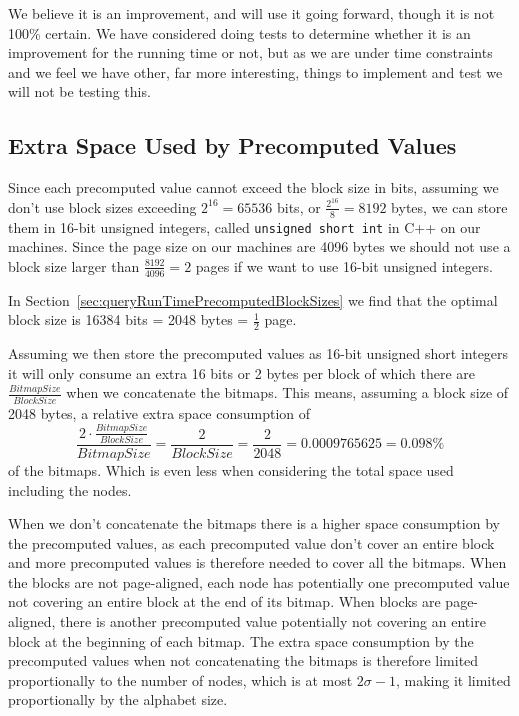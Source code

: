 We believe it is an improvement, and will use it going forward, though it is not 100\% certain.
We have considered doing tests to determine whether it is an improvement for the running time or not, but as we are under time constraints and we feel we have other, far more interesting, things to implement and test we will not be testing this.



\subsection{Extra Space Used by Precomputed Values}
Since each precomputed value cannot exceed the block size in bits, assuming we don't use block sizes exceeding $2^{16} = 65536$ bits, or $\frac{2^{16}}{8} = 8192$ bytes, we can store them in 16-bit unsigned integers, called \texttt{unsigned short int} in C++ on our machines.
Since the page size on our machines are 4096 bytes we should not use a block size larger than $\frac{8192}{4096} = 2$ pages if we want to use 16-bit unsigned integers.

In Section~\ref{sec:queryRunTimePrecomputedBlockSizes} we find that the optimal block size is 16384 bits = 2048 bytes = $\frac{1}{2}$ page.

Assuming we then store the precomputed values as 16-bit unsigned short integers it will only consume an extra 16 bits or 2 bytes per block of which there are $\frac{BitmapSize}{BlockSize}$ when we concatenate the bitmaps.
This means, assuming a block size of 2048 bytes, a relative extra space consumption of
\[ \frac{ 2 \cdot \frac{BitmapSize}{BlockSize} }{BitmapSize} = \frac{2}{BlockSize} = \frac{2}{2048} = 0.0009765625 = 0.098\% \]
of the bitmaps.
Which is even less when considering the total space used including the nodes.

When we don't concatenate the bitmaps there is a higher space consumption by the precomputed values, as each precomputed value don't cover an entire block and more precomputed values is therefore needed to cover all the bitmaps.
When the blocks are not page-aligned, each node has potentially one precomputed value not covering an entire block at the end of its bitmap.
When blocks are page-aligned, there is another precomputed value potentially not covering an entire block at the beginning of each bitmap.
The extra space consumption by the precomputed values when not concatenating the bitmaps is therefore limited proportionally to the number of nodes, which is at most $2 \sigma - 1$, making it limited proportionally by the alphabet size.

